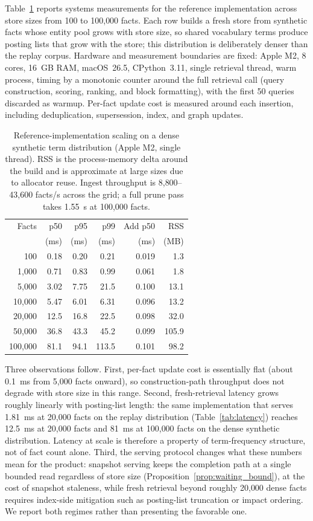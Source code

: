 \documentclass[letterpaper]{article} %
\begin{document}
Table~\ref{tab:scaling} reports systems measurements for the reference implementation across store sizes from 100 to 100{,}000 facts. Each row builds a fresh store from synthetic facts whose entity pool grows with store size, so shared vocabulary terms produce posting lists that grow with the store; this distribution is deliberately denser than the replay corpus. Hardware and measurement boundaries are fixed: Apple M2, 8 cores, 16~GB RAM, macOS~26.5, CPython~3.11, single retrieval thread, warm process, timing by a monotonic counter around the full retrieval call (query construction, scoring, ranking, and block formatting), with the first 50 queries discarded as warmup. Per-fact update cost is measured around each insertion, including deduplication, supersession, index, and graph updates.

\begin{table}[t]
\centering
\small
\begin{tabular}{@{}rrrrrr@{}}
\toprule
Facts & p50 & p95 & p99 & Add p50 & RSS \\
 & (ms) & (ms) & (ms) & (ms) & (MB) \\
\midrule
100     & 0.18 & 0.20 & 0.21 & 0.019 & 1.3 \\
1{,}000  & 0.71 & 0.83 & 0.99 & 0.061 & 1.8 \\
5{,}000  & 3.02 & 7.75 & 21.5 & 0.100 & 13.1 \\
10{,}000 & 5.47 & 6.01 & 6.31 & 0.096 & 13.2 \\
20{,}000 & 12.5 & 16.8 & 22.5 & 0.098 & 32.0 \\
50{,}000 & 36.8 & 43.3 & 45.2 & 0.099 & 105.9 \\
100{,}000 & 81.1 & 94.1 & 113.5 & 0.101 & 98.2 \\
\bottomrule
\end{tabular}
\caption{Reference-implementation scaling on a dense synthetic term distribution (Apple M2, single thread). RSS is the process-memory delta around the build and is approximate at large sizes due to allocator reuse. Ingest throughput is 8{,}800--43{,}600 facts/s across the grid; a full prune pass takes 1.55~s at 100{,}000 facts.}
\label{tab:scaling}
\end{table}

Three observations follow. First, per-fact update cost is essentially flat (about 0.1~ms from 5{,}000 facts onward), so construction-path throughput does not degrade with store size in this range. Second, fresh-retrieval latency grows roughly linearly with posting-list length: the same implementation that serves 1.81~ms at 20{,}000 facts on the replay distribution (Table~\ref{tab:latency}) reaches 12.5~ms at 20{,}000 facts and 81~ms at 100{,}000 facts on the dense synthetic distribution. Latency at scale is therefore a property of term-frequency structure, not of fact count alone. Third, the serving protocol changes what these numbers mean for the product: snapshot serving keeps the completion path at a single bounded read regardless of store size (Proposition~\ref{prop:waiting_bound}), at the cost of snapshot staleness, while fresh retrieval beyond roughly 20{,}000 dense facts requires index-side mitigation such as posting-list truncation or impact ordering. We report both regimes rather than presenting the favorable one.
\end{document}
